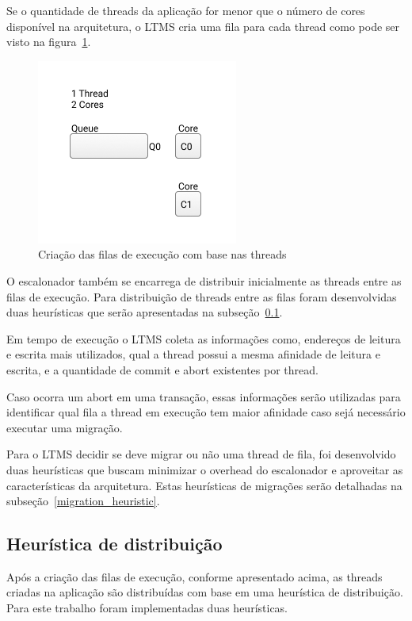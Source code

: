 \documentclass[diss,capa]{texufpel}
\begin{document}
Se o quantidade de threads da aplicação for menor que o número de cores disponível na arquitetura, o LTMS cria uma fila para cada thread como pode ser visto na figura~\ref{queue_thread}.

\begin{figure}[htbp]
  \centering
  \includegraphics[scale=.8]{images/Queues_thread.png}
\caption{Criação das filas de execução com base nas threads} 
\label{queue_thread}
\end{figure}

O escalonador também se encarrega de distribuir inicialmente as threads entre as filas de execução. Para distribuição de threads entre as filas foram desenvolvidas duas heurísticas que serão apresentadas na subseção~\ref{distribuition_heuristic}.

Em tempo de execução o LTMS coleta as informações como, endereços de leitura e escrita mais utilizados, qual a thread possui a mesma afinidade de leitura e escrita, e a quantidade de commit e abort existentes por thread.

Caso ocorra um abort em uma transação, essas informações serão utilizadas para identificar qual fila a thread em execução tem maior afinidade caso sejá necessário executar uma migração.

Para o LTMS decidir se deve migrar ou não uma thread de fila, foi desenvolvido duas heurísticas que buscam minimizar o overhead do escalonador e aproveitar as características da arquitetura. Estas heurísticas de migrações serão detalhadas na subseção~\ref{migration_heuristic}.

\subsection{Heurística de distribuição}
\label{distribuition_heuristic}

Após a criação das filas de execução, conforme apresentado acima, as threads criadas na aplicação são distribuídas com base em uma heurística de distribuição. Para este trabalho foram implementadas duas heurísticas.
\end{document}
